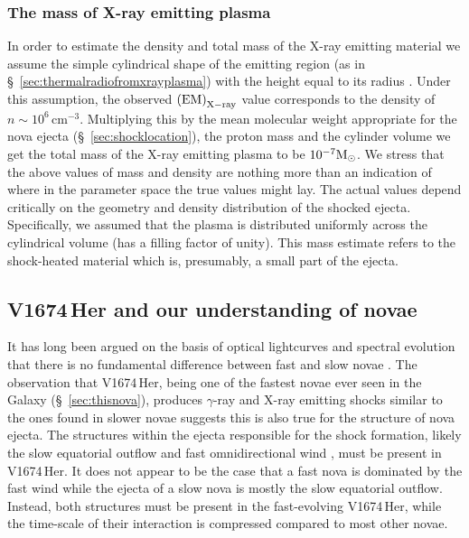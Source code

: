 \documentclass[a4paper,fleqn,usenatbib]{mnras}
\newcommand{\nova}{V1674\,Her}
\begin{document}
\subsubsection{The mass of X-ray emitting plasma}
\label{sec:xrayemittermass}

In order to estimate the density and total mass of the X-ray emitting material we 
assume the simple cylindrical shape of the emitting region (as in \S~\ref{sec:thermalradiofromxrayplasma})
with the height equal to its radius 
\citep[geometry used by][]{1989MNRAS.237...81T}. %
Under this assumption, the observed ${\rm (EM)}_{\rm X-ray}$ value 
corresponds to the density of $n \sim 10^6$\,cm$^{-3}$. Multiplying this by
the mean molecular weight appropriate for the nova ejecta
(\S~\ref{sec:shocklocation}), the proton mass 
and the cylinder volume we 
get the total mass of the X-ray emitting plasma to be $10^{-7} {\rm M}_\odot$. 
We stress that the above values of mass and density are nothing more than 
an indication of where in the parameter space the true values might lay.
The actual values depend critically on the geometry and density distribution
of the shocked ejecta. Specifically, we assumed that the plasma is
distributed uniformly across the cylindrical volume (has a filling factor of
unity). This mass estimate refers to the shock-heated material
which is, presumably, a small part of the ejecta.



\subsection{\nova{} and our understanding of novae}
\label{sec:comfastslow}

It has long been argued on the basis of optical lightcurves and spectral
evolution that there is no fundamental difference between fast and slow
novae \citep{1939PA.....47..410M,1939PA.....47..481M,1939PA.....47..538M}.
%
The observation that \nova{}, being one of the fastest novae ever seen in 
the Galaxy (\S~\ref{sec:thisnova}), produces $\gamma$-ray and X-ray emitting shocks 
similar to the ones found in slower novae suggests this is also true for the
structure of nova ejecta. The structures within the ejecta responsible for 
the shock formation, likely the slow equatorial outflow and fast omnidirectional
wind \citep[][\S~\ref{sec:shocklocation}]{2014Natur.514..339C,2022ApJ...938...31S}, must be present in \nova{}.
It does not appear to be the case that a fast nova is dominated by the fast
wind while the ejecta of a slow nova is mostly the slow equatorial outflow.
Instead, both structures must be present in the fast-evolving \nova{}, 
while the time-scale of their interaction is compressed compared to most
other novae.
\end{document}
